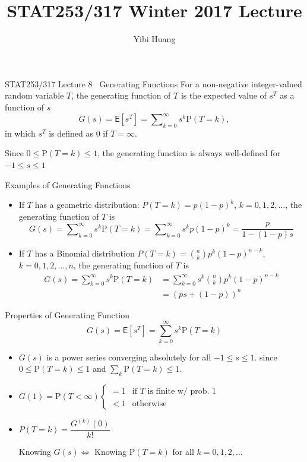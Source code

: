 \documentclass[letterpaper, mathserif]{beamer}
\title{STAT253/317 Winter 2017 Lecture \chapnum}
\date{}
\author{Yibi Huang}
\def\p{\mathrm P}
\def\E{\mathsf E}
\def\Sum{\sum\nolimits}
\def\chapnum{8}
\begin{document}
\begin{frame}{STAT253/317 Lecture \chapnum ~ Generating Functions}
For a non-negative integer-valued random variable $T$, the generating function of $T$ is the expected value of $s^T$
as a function of $s$
\[
G(s)=\E[s^T]=\Sum_{k=0}^\infty s^k\p(T=k),
\]
in which $s^T$ is defined as 0 if $T=\infty$.

Since $0\le \p(T=k)\le 1$, the generating function is always well-defined for $-1\le s \le 1$
\end{frame}
\begin{frame}{Examples of Generating Functions}
\begin{itemize}
\item If $T$ has a geometric distribution: $P(T=k)=p(1-p)^k$, $k=0,1,2,\ldots$,
the generating function of $T$ is
\[
G(s)=\Sum_{k=0}^\infty s^k\p(T=k)=\Sum_{k=0}^\infty s^kp(1-p)^k=\frac{p}{1-(1-p)s}
\]
\item If $T$ has a Binomial distribution $P(T=k)={n\choose k}p^k(1-p)^{n-k}$, $k=0,1,2,\ldots,n$,
the generating function of $T$ is
\begin{align*}
G(s)=\Sum_{k=0}^\infty s^k\p(T=k)
&=\Sum_{k=0}^\infty s^k{n\choose k}p^k(1-p)^{n-k}\\
&=(ps+(1-p))^n
\end{align*}
\end{itemize}
\end{frame}
\begin{frame}{Properties of Generating Function}
\[
G(s)=\E[s^T]=\sum_{k=0}^\infty s^k\p(T=k)
\]

\begin{itemize}\itemsep=12pt
\item $G(s)$ is a power series converging absolutely for all $-1\!\le\!s\!\le\!1$.
since $0\le \p(T=k)\le 1$ and $\sum_k \p(T=k)\le 1.$
\item $\displaystyle G(1)=\p(T<\infty)
\begin{cases}
=1 & \text{if $T$ is finite w/ prob. 1}\\
<1 & \text{otherwise}
\end{cases}$
\item $P(T=k)=\dfrac{G^{(k)}(0)}{k!}$\par\medskip
Knowing $G(s)\Leftrightarrow$ Knowing $\p(T=k)$ for all $k=0,1,2,\ldots$
\end{itemize}
\end{frame}
\end{document}

